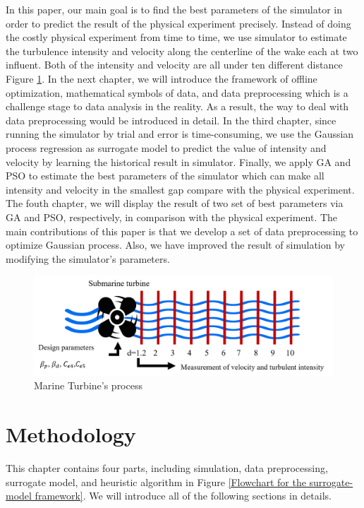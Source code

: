 In this paper, our main goal is to find the best parameters of the simulator in order to predict the result of the physical experiment precisely. Instead of doing the costly physical experiment from time to time, we use simulator to estimate the turbulence intensity and velocity along the centerline of the wake each at two influent. Both of the intensity and velocity are all under ten different distance Figure \ref{fig:Marine Turbine}. In the next chapter, we will introduce the framework of offline optimization, mathematical symbols of data, and data preprocessing which is a challenge stage to data analysis in the reality. As a result, the way to deal with data preprocessing would be introduced in detail. In the third chapter, since running the simulator by trial and error is time-consuming, we use the Gaussian process regression as surrogate model to predict the value of intensity and velocity by learning the historical result in simulator. Finally, we apply GA and PSO to estimate the best parameters of the simulator which can make all intensity and velocity in the smallest gap compare with the physical experiment. The fouth chapter, we will display the result of two set of best parameters via GA and PSO, respectively, in comparison with the physical experiment. The main contributions of this paper is that we develop a set of data preprocessing to optimize Gaussian process. Also, we have improved the result of simulation by modifying the simulator's parameters.


\begin{figure}[h]
	\centering
	\includegraphics[width=1\textwidth]{images/marine.png}
	\caption{Marine Turbine's process}
	\label{fig:Marine Turbine}
\end{figure}

\chapter{Methodology}

This chapter contains four parts, including simulation, data preprocessing, surrogate model, and heuristic algorithm in Figure \ref{Flowchart for the surrogate-model framework}. We will introduce all of the following sections in details.

